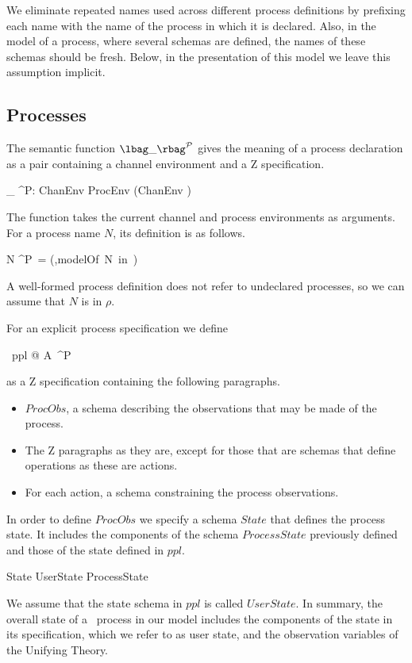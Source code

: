 \documentclass{article}
\begin{document}
We eliminate repeated names used across different process definitions
by prefixing each name with the name of the process in which it is
declared.  Also, in the model of a process, where several schemas are
defined, the names of these schemas should be fresh.  Below, in the
presentation of this model we leave this assumption implicit.

\subsection{Processes}

The semantic function \mbox{$\lbag\_ \rbag^{\cal P}$} gives the
meaning of a process declaration as a pair containing a channel
environment and a Z specification.
\begin{zed}
  \lbag\_ \rbag^{\cal P}:  \pfun ChanEnv \pfun ProcEnv
  \pfun (ChanEnv \times {})
\end{zed}
The function takes the current channel and process environments as
arguments.  For a process name $N$, its definition is as follows.
\begin{zed}
  \lbag N \rbag^{\cal P}\gamma\ \rho = (\gamma,modelOf\ N\ in\ \rho)
\end{zed}
A well-formed process definition does not refer to undeclared
processes, so we can assume that $N$ is in $\rho$.

For an explicit process specification we define
\begin{zed}
  \lbag \circbegin\ ppl @ A\ \circend\rbag^{\cal P}\ \gamma\ \rho
\end{zed}
as a Z specification containing the following paragraphs.
\begin{itemize}
\item $ProcObs$, a schema describing the observations that may be made
  of the process.
\item The Z paragraphs as they are, except for those that are schemas
  that define operations as these are actions.
\item For each action, a schema constraining the process observations.
\end{itemize}
In order to define $ProcObs$ we specify a schema $State$ that defines
the process state.  It includes the components of the schema
$ProcessState$ previously defined and those of the state defined in
$ppl$.
\begin{zed}
  State  UserState \land ProcessState
\end{zed}
We assume that the state schema in $ppl$ is called $UserState$.  In
summary, the overall state of a \Circus\ process in our model includes
the components of the state in its specification, which we refer to as
user state, and the observation variables of the Unifying Theory.
\end{document}
